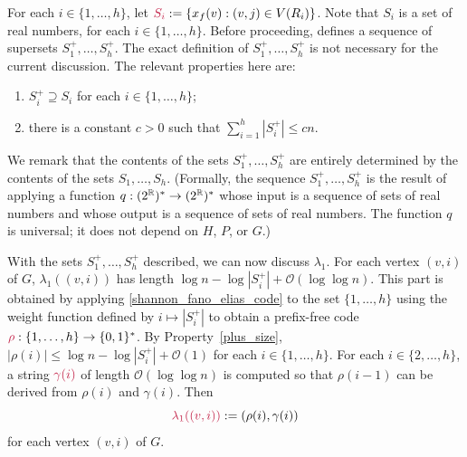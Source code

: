 \documentclass{patmorin}
\makeatletter
\renewcommand{\le}{\leqslant}
\newcommand{\defin}[1]{\emph{\textcolor{brightmaroon}{#1}}}
\def\mathcolor#1#{\@mathcolor{#1}}
\def\@mathcolor#1#2#3{%
  \protect\leavevmode
  \begingroup
    \color#1{#2}#3%
  \endgroup
}
\newcommand{\mathdefin}[1]{\mathcolor{brightmaroon}{#1}}
\newcommand{\Oh}{\calO}
\newcommand{\calO}{\mathcal{O}}
\makeatother
\begin{document}
  For each $i\in\{1,\ldots,h\}$, let $\mathdefin{S_i}:=\{x_f(v):(v,j)\in V(R_i)\}$.
  Note that $S_i$ is a set of real numbers, for each $i\in\{1,\ldots,h\}$.
  Before proceeding, \cite{dujmovic.esperet.ea:adjacency} defines a sequence of supersets \defin{$S^+_1,\ldots,S^+_h$}. The exact definition of $S^+_1,\ldots,S^+_h$ is not necessary for the current discussion.
  The relevant properties here are:
  \begin{enumerate}[label=(\alph*)]
      \item\label{plus_superset} $S^+_i\supseteq S_i$ for each $i\in\{1,\ldots,h\}$;
      \item\label{plus_size} there is a constant $c>0$ such that $\sum_{i=1}^h |S^+_i|\le cn$.
  \end{enumerate}
  We remark that the contents of the sets $S^+_1,\ldots,S^+_h$ are entirely determined by the contents of the sets $S_1,\ldots,S_h$.
  (Formally, the sequence $S^+_1,\ldots,S^+_h$ is the result of applying a function $q:(2^{\mathbb{R}})^*\to (2^{\mathbb{R}})^*$ whose input is a sequence of sets of real numbers and whose output is a sequence of sets of real numbers. The function $q$ is universal; it does not depend on $H$, $P$, or $G$.)

  With the sets $S^+_1,\ldots,S^+_h$ described, we can now discuss $\lambda_1$.
  For each vertex $(v,i)$ of $G$, $\lambda_1((v,i))$ has length $\log n - \log |S^+_i| + \Oh(\log\log n)$.
  This part is obtained by applying \cref{shannon_fano_elias_code} to the set $\{1,\ldots,h\}$ using the weight function defined by $i \mapsto |S^+_i|$ to obtain a prefix-free code $\mathdefin{\rho}:\{1,\ldots,h\}\to\{0,1\}^*$.
  By Property~\ref{plus_size}, $|\rho(i)|\le \log n - \log|S^+_i| + \Oh(1)$ for each $i\in\{1,\ldots,h\}$.
  For each $i\in\{2,\ldots,h\}$, a string $\mathdefin{\gamma(i)}$ of length $\Oh(\log\log n)$ is computed so that $\rho(i-1)$ can be derived from $\rho(i)$ and $\gamma(i)$.
  Then
  \[
     \mathdefin{\lambda_1((v,i))}:=(\rho(i),\gamma(i))
  \]
  for each vertex $(v,i)$ of $G$.
\end{document}
